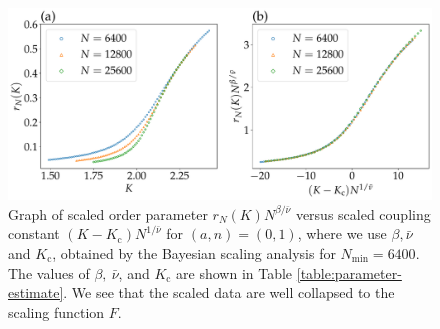 \begin{figure}[t]
  \begin{center}
    \includegraphics[width=\textwidth]{figs/collapse_plot.pdf}
  \end{center}
  \caption{
    Graph of scaled order parameter $r_{N}(K)N^{\beta/\bar{\nu}}$ versus scaled coupling constant $(K-K_{\mathrm{c}})N^{1/\bar{\nu}}$
    for $(a,n)=(0,1)$,
    where we use $\beta,\bar{\nu}$ and $K_{\mathrm{c}}$, obtained by the Bayesian scaling analysis for $N_{\min}=6400$.
    The values of $\beta,\ \bar{\nu}$, and $K_{\mathrm{c}}$ are shown in Table \ref{table:parameter-estimate}.
    We see that the scaled data are well collapsed to the scaling function $F$.
  }
  \label{fig:fit}
\end{figure}


